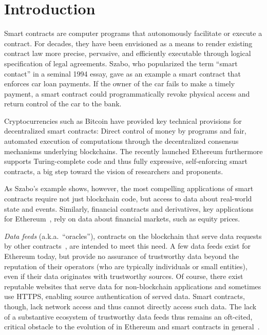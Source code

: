 \section{Introduction}

Smart contracts are computer programs that autonomously facilitate or execute a contract. For decades, they have been envisioned as a means to  render existing contract law more precise, pervasive, and efficiently executable through logical specification of legal agreements. Szabo, who popularized the term ``smart contact'' in a seminal 1994 essay, gave as an example a smart contract that enforces car loan payments. If the owner of the car fails to make a timely payment, a smart contract could programmatically revoke physical access and return control of the car to the bank. %

Cryptocurrencies such as Bitcoin have provided key technical provisions for decentralized smart contracts: Direct control of money by programs and fair, automated execution of computations through the decentralized consensus mechanisms underlying  blockchains. 
The recently launched Ethereum furthermore supports Turing-complete code and thus fully expressive, self-enforcing smart contracts, a big step toward the vision of researchers and proponents.  

As Szabo's example shows, however, the most compelling applications of smart contracts require not just blockchain code, but access to data about real-world state and events. Similarly, financial contracts and derivatives, key applications for Ethereum~\cite{}, rely on data about financial markets, such as equity prices. %

\emph{Data feeds} (a.k.a.~``oracles''), contracts on the blockchain that serve data requests by other contracts~\cite{whitepaper,yellowpaper}, are intended to meet this need. A few data feeds exist for Ethereum today, but provide no assurance of trustworthy data beyond the reputation of their operators (who are typically individuals or small entities), even if their data originates with trustworthy sources. Of course, there exist reputable websites that serve data for non-blockchain applications and sometimes use HTTPS, enabling source authentication of served data. Smart contracts, though, lack network access and thus cannot directly access such data. The lack of a substantive ecosystem of trustworthy data feeds thus remains an oft-cited, critical obstacle to the evolution of in Ethereum and smart contracts in general~\cite{???}.

